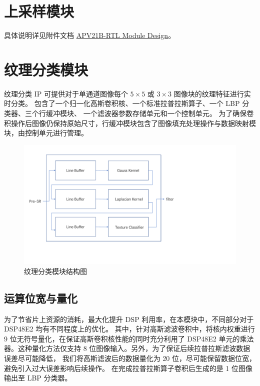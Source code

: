 \documentclass[12pt, a4paper, oneside]{ctexbook}
\begin{document}
	\chapter{上采样模块}
	具体说明详见附件文档 \href{./ref/APV21B_RTL_Module_Design.pdf}{APV21B-RTL Module Design}。
	
	\chapter{纹理分类模块}
	纹理分类 IP 可提供对于单通道图像每个 $5\times5$ 或 $3\times3$ 图像块的纹理特征进行实时分类。
	包含了一个归一化高斯卷积核、一个标准拉普拉斯算子、一个 LBP 分类器、三个行缓冲模块、
	一个滤波器参数存储单元和一个控制单元。
	为了确保卷积操作后图像仍保持原始尺寸，行缓冲模块包含了图像填充处理操作与数据映射模块，由控制单元进行管理。

	\begin{figure}[h]
	\centering
	\includegraphics[scale=0.55]{./pic/texture}
	\caption{纹理分类模块结构图}
	\label{fig:texture}
	\end{figure}



	\section{运算位宽与量化}
	为了节省片上资源的消耗，最大化提升 DSP 利用率，在本模块中，不同部分对于 DSP48E2 均有不同程度上的优化。
	其中，针对高斯滤波卷积中，将核内权重进行 9 位无符号量化，在保证高斯卷积核性能的同时充分利用了 DSP48E2 
	单元的乘法器。这种量化方法仅支持 8 位图像输入。另外，为了保证后续拉普拉斯滤波数据误差尽可能降低，
	我们将高斯滤波后的数据量化为 20 位，尽可能保留数据位宽，避免引入过大误差影响后续操作。
	在完成拉普拉斯算子卷积后生成的是 1 位图像输出至 LBP 分类器。
\end{document}
